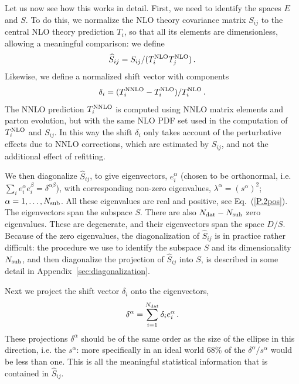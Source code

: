 Let us now see how this works in detail. First, we
need to identify
the spaces $E$ and $S$.
%
To do this, we normalize the NLO theory covariance matrix $S_{ij}$ to
the central NLO theory prediction $T_i$, so that all its elements 
are dimensionless, allowing a meaningful comparison: we define
\begin{equation}
\widehat{S}_{ij} = S_{ij}/(T^{\rm NLO}_iT^{\rm NLO}_j)\, .\label{eq:Snorm}
\end{equation}
Likewise, we define a normalized shift vector with components 
\begin{equation}
{\delta}_i = (T^{\rm NNLO}_i-T^{\rm NLO}_i)/T^{\rm NLO}_i \, .\label{eq:normshift}
\end{equation}
The NNLO prediction $T^{\rm NNLO}_i$ is computed using NNLO matrix elements 
and parton evolution, but with the same NLO PDF set used in the computation of 
$T^{\rm NLO}_i$ and $S_{ij}$. In this way the shift $\delta_i$ only takes 
account of the perturbative effects due to NNLO corrections, which are estimated by $S_{ij}$, and not the additional effect of refitting.

%
We then diagonalize $\widehat{S}_{ij}$, to give
eigenvectors, $e_i^\alpha$ (chosen to be orthonormal, i.e. $\sum_i
e_i^\alpha e_i^\beta = \delta^{\alpha\beta}$), with corresponding
non-zero eigenvalues, $\lambda^\alpha=(s^\alpha)^2$; $\alpha = 1,
\ldots, N_{\rm sub}$. All these eigenvalues are real and positive, see
Eq.~(\ref{P.2pos}). The eigenvectors span the subspace $S$.
%
There are also  $N_{\rm dat}-N_{\rm sub}$ zero eigenvalues. These are
degenerate, and their eigenvectors span the space $D/S$. Because of
the zero eigenvalues, the diagonalization of $\widehat{S}_{ij}$ is in
practice rather difficult: the procedure we use to identify the
subspace $S$ and its dimensionality $N_{\rm sub}$, and then
diagonalize the projection of $\widehat{S}_{ij}$ into $S$,  is 
described in some detail in Appendix~\ref{sec:diagonalization}.  

Next we project the shift vector $\delta_i$ onto the eigenvectors,
\begin{equation}\label{eq:deltaproj}
\delta^\alpha = \sum_{i=1}^{N_{\rm dat}} \delta_i e_i^\alpha \, .
\end{equation} 
These projections $\delta^\alpha$ should be of the same order as the size 
of the ellipse in this direction, i.e. the $s^\alpha$: more specifically in an ideal world 68\% of the $\delta^\alpha/s^\alpha$ would be less than one.
%
This is all the meaningful statistical information that is contained
in $\widehat{S}_{ij}$.

